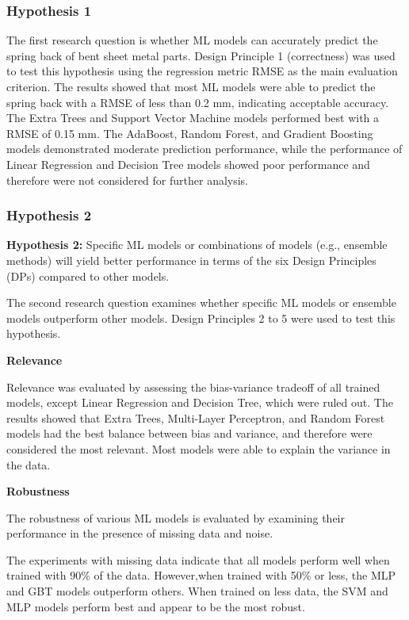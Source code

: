 
\subsubsection{Hypothesis 1}

The first research question is whether ML models can accurately predict the spring back of bent sheet metal parts.
Design Principle 1 (correctness) was used to test this hypothesis using the regression metric RMSE as the main
evaluation criterion.
The results showed that most ML models were able to predict the spring back with a RMSE of less
than 0.2 mm, indicating acceptable accuracy.
The Extra Trees and Support Vector Machine models performed best with a RMSE of 0.15 mm.
The AdaBoost, Random Forest, and Gradient Boosting models demonstrated moderate prediction
performance, while the performance of Linear Regression and Decision Tree models showed poor performance and
therefore were not considered for further analysis.

\subsubsection{Hypothesis 2}

\textbf{Hypothesis 2:} Specific ML models or combinations of models (e.g., ensemble methods) will yield better
performance
in terms of the six Design Principles (DPs) compared to other models.

The second research question examines whether specific ML models or ensemble models outperform other models.
Design Principles 2 to 5 were used to test this hypothesis.

\textbf{Relevance}

Relevance was evaluated by assessing the bias-variance tradeoff of all trained models, except Linear Regression and
Decision Tree, which were ruled out.
The results showed that Extra Trees, Multi-Layer Perceptron, and Random Forest models had the best balance between
bias and variance, and therefore were considered the most relevant.
Most models were able to explain the variance in the data.

\textbf{Robustness}

The robustness of various ML models is evaluated by examining their performance in the presence of
missing data and noise.

The experiments with missing data indicate that all models perform well when trained with 90\% of the data.
However,when trained with 50\% or less, the MLP and GBT models outperform others.
When trained on less data, the SVM and MLP models perform best and appear to be the most robust.

